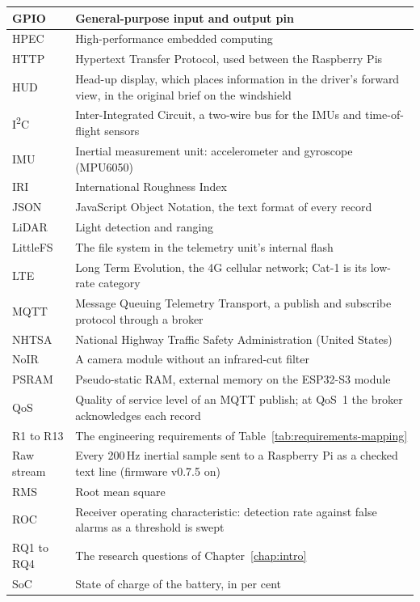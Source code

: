 \documentclass[a4paper,11pt]{report}
\begin{document}
{{\begin{longtable}{|>{\raggedright\arraybackslash}p{2.6cm}|>{\raggedright\arraybackslash}p{11.2cm}|}
GPIO & General-purpose input and output pin \\ \hline
HPEC & High-performance embedded computing \\ \hline
HTTP & Hypertext Transfer Protocol, used between the Raspberry Pis \\ \hline
HUD & Head-up display, which places information in the driver's forward view, in the original brief on the windshield \\ \hline
I\textsuperscript{2}C & Inter-Integrated Circuit, a two-wire bus for the IMUs and time-of-flight sensors \\ \hline
IMU & Inertial measurement unit: accelerometer and gyroscope (MPU6050) \\ \hline
IRI & International Roughness Index \\ \hline
JSON & JavaScript Object Notation, the text format of every record \\ \hline
LiDAR & Light detection and ranging \\ \hline
LittleFS & The file system in the telemetry unit's internal flash \\ \hline
LTE & Long Term Evolution, the 4G cellular network; Cat-1 is its low-rate category \\ \hline
MQTT & Message Queuing Telemetry Transport, a publish and subscribe protocol through a broker \\ \hline
NHTSA & National Highway Traffic Safety Administration (United States) \\ \hline
NoIR & A camera module without an infrared-cut filter \\ \hline
PSRAM & Pseudo-static RAM, external memory on the ESP32-S3 module \\ \hline
QoS & Quality of service level of an MQTT publish; at QoS~1 the broker acknowledges each record \\ \hline
R1 to R13 & The engineering requirements of Table~\ref{tab:requirements-mapping} \\ \hline
Raw stream & Every 200\,Hz inertial sample sent to a Raspberry Pi as a checked text line (firmware v0.7.5 on) \\ \hline
RMS & Root mean square \\ \hline
ROC & Receiver operating characteristic: detection rate against false alarms as a threshold is swept \\ \hline
RQ1 to RQ4 & The research questions of Chapter~\ref{chap:intro} \\ \hline
SoC & State of charge of the battery, in per cent \\ \hline

\end{longtable}}}
\end{document}
